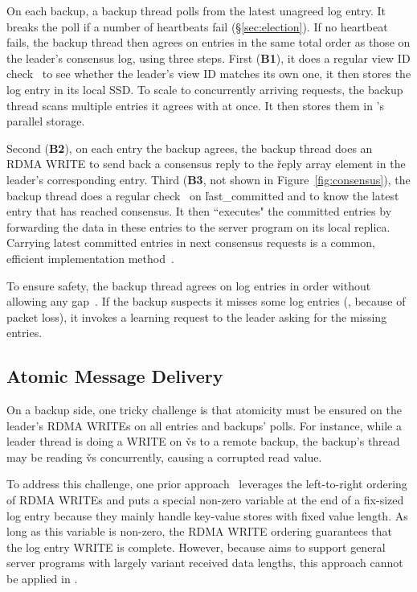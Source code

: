 On each backup, a backup thread polls from the latest unagreed log entry. It 
breaks the poll if a number of heartbeats fail 
(\S\ref{sec:election}). 
If no heartbeat fails, the backup thread then agrees on entries in the same 
total order as those on the leader's consensus log, using three steps. First 
(\textbf{B1}), it does a regular \paxos view ID check~\cite{paxos:practical} to 
see whether the leader's view ID matches its own one, it then stores the log 
entry in its local SSD. To scale to concurrently arriving requests, the backup 
thread scans multiple entries it agrees with at once. It then stores them 
in \xxx's parallel storage.

Second (\textbf{B2}), on each entry the backup agrees, the backup thread does 
an RDMA WRITE to send back a consensus reply to the \v{reply} array element in 
the leader's corresponding entry. Third (\textbf{B3}, not shown 
in Figure~\ref{fig:consensus}), the backup thread does a regular \paxos 
check~\cite{paxos:practical} on \v{last\_committed} and to know the latest 
entry that has reached consensus. It then ``executes" the committed entries by 
forwarding the data in these entries to the server program on its local 
replica. Carrying latest committed entries in next consensus requests is a 
common, efficient \paxos implementation method~\cite{paxos:practical}.

To ensure \paxos safety, the backup thread agrees on log 
entries in order without allowing any gap~\cite{paxos:practical}. If the 
backup suspects it misses some log entries (\eg, because of packet loss),
it invokes a learning request to the leader asking for the 
missing entries.

\subsection{Atomic Message Delivery} \label{sec:atomic}

On a backup side, one tricky challenge is that atomicity must be 
ensured on the leader's RDMA WRITEs on all entries and backups' polls. For 
instance, while a leader thread is doing a WRITE on \v{vs} to a remote backup, 
the backup's thread may be reading \v{vs} concurrently, causing a 
corrupted read value.

To address this challenge, one prior 
approach~\cite{farm:nsdi14,herd:sigcomm14} 
leverages the left-to-right ordering of RDMA WRITEs and puts a special 
non-zero variable at the end of a fix-sized log entry because they mainly 
handle key-value stores with fixed value length. As long as this variable is 
non-zero, the RDMA WRITE ordering guarantees that the log entry WRITE is 
complete. However, because \xxx aims to support general server programs with 
largely variant received data lengths, this approach cannot be applied in \xxx.

